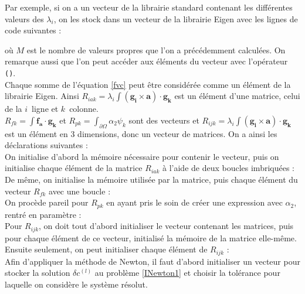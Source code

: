 Par exemple, si on a un vecteur de la librairie standard contenant les différentes valeurs des $\lambda_i$, on les stock dans un vecteur de la librairie Eigen avec les lignes de code suivantes : 

où $M$ est le nombre de valeurs propres que l'on a précédemment calculées. On remarque aussi que l'on peut accéder aux éléments du vecteur avec l'opérateur \texttt{()}.\\

Chaque somme de l'équation \ref{fvc} peut être considérée comme un élément de la librairie Eigen. Ainsi $R_{iak}=\lambda_i\int (\mathbf{g_i}\times\mathbf{a})\cdot\mathbf{g_k}$ est un élément d'une matrice, celui de la $i$\ieme\ ligne et $k$\ieme\ colonne.\\
$R_{fk} = \int \mathbf{f_a}\cdot\mathbf{g_k}$ et $R_{pk} = \int_{\partial\Omega}\alpha_2\psi_k$ sont des vecteurs et $R_{ijk} = \lambda_i\int (\mathbf{g_i}\times\mathbf{a})\cdot\mathbf{g_k}$ est un élément en 3 dimensions, donc un vecteur de matrices. On a ainsi les déclarations suivantes :\\


On initialise d'abord la mémoire nécessaire pour contenir le vecteur, puis on initialise chaque élément de la matrice $R_{iak}$ à l'aide de deux boucles imbriquées :\\


De même, on initialise la mémoire utilisée par la matrice, puis chaque élément du vecteur $R_{fk}$ avec une boucle :\\


On procède pareil pour $R_{pk}$ en ayant pris le soin de créer une expression avec $\alpha_2$, rentré en paramètre :\\


Pour $R_{ijk}$, on doit tout d'abord initialiser le vecteur contenant les matrices, puis pour chaque élément de ce vecteur, initialisé la mémoire de la matrice elle-même. Ensuite seulement, on peut initialiser chaque élément de $R_{ijk}$ :\\


Afin d'appliquer la méthode de Newton, il faut d'abord initialiser un vecteur pour stocker la solution $\delta c^{(l)}$ au problème \ref{INewton1} et choisir la tolérance pour laquelle on considère le système résolut.\\


